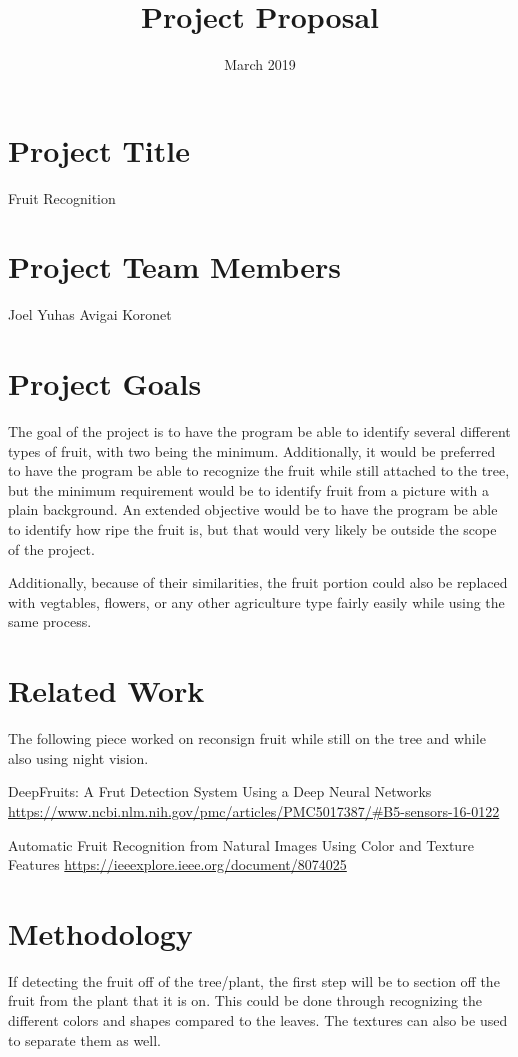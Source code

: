 \documentclass{article}
\title{Project Proposal}
\date{March 2019}
\begin{document}
\maketitle

\section{Project Title}
Fruit Recognition

\section{Project Team Members}
Joel Yuhas
Avigai Koronet

\section{Project Goals}
The goal of the project is to have the program be able to identify several different types of fruit, with two being the minimum. Additionally, it would be preferred to have the program be able to recognize the fruit while still attached to the tree, but the minimum requirement would be to identify fruit from a picture with a plain background. An extended objective would be to have the program be able to identify how ripe the fruit is, but that would very likely be outside the scope of the project.

Additionally, because of their similarities, the fruit portion could also be replaced with vegtables, flowers, or any other agriculture type fairly easily while using the same process.

\section{Related Work}
The following piece worked on reconsign fruit while still on the tree and while also using night vision.

DeepFruits: A Frut Detection System Using a Deep Neural Networks 
\url{https://www.ncbi.nlm.nih.gov/pmc/articles/PMC5017387/#B5-sensors-16-0122}

Automatic Fruit Recognition from Natural Images Using Color and Texture Features
\url{https://ieeexplore.ieee.org/document/8074025}

\section{Methodology}
If detecting the fruit off of the tree/plant, the first step will be to section off the fruit from the plant that it is on. This could be done through recognizing the different colors and shapes compared to the leaves. The textures can also be used to separate them as well.
\end{document}
